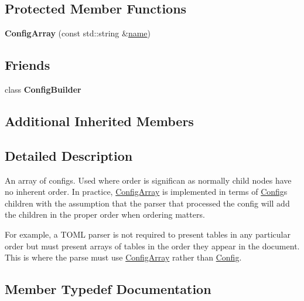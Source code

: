 \subsection*{Protected Member Functions}
\begin{DoxyCompactItemize}
\item 
\mbox{\label{classtheoria_1_1config_1_1ConfigArray_a9086dda6fa6d659256f50be797dfe719}} 
{\bfseries Config\+Array} (const std\+::string \&\hyperlink{classtheoria_1_1config_1_1Config_af4929f1c9b86576fdc439051a10f89cd}{name})
\end{DoxyCompactItemize}
\subsection*{Friends}
\begin{DoxyCompactItemize}
\item 
\mbox{\label{classtheoria_1_1config_1_1ConfigArray_a3d61732fded713b38fc7f9fe3d80e2ae}} 
class {\bfseries Config\+Builder}
\end{DoxyCompactItemize}
\subsection*{Additional Inherited Members}


\subsection{Detailed Description}
An array of configs. Used where order is significan as normally child nodes have no inherent order. In practice, \hyperlink{classtheoria_1_1config_1_1ConfigArray}{Config\+Array} is implemented in terms of \hyperlink{classtheoria_1_1config_1_1Config}{Config}\textquotesingle{}s children with the assumption that the parser that processed the config will add the children in the proper order when ordering matters.

For example, a T\+O\+ML parser is not required to present tables in any particular order but must present arrays of tables in the order they appear in the document. This is where the parse must use \hyperlink{classtheoria_1_1config_1_1ConfigArray}{Config\+Array} rather than \hyperlink{classtheoria_1_1config_1_1Config}{Config}. 

\subsection{Member Typedef Documentation}
\mbox{\label{classtheoria_1_1config_1_1ConfigArray_ace80948768681e7eb033825f4fe761f2}} 

